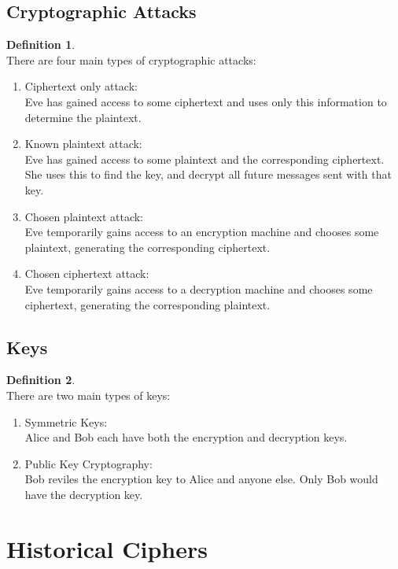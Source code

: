 \documentclass[letterpaper,10pt,twoside]{report}
\theoremstyle{plain}
\theoremstyle{definition}
\newtheorem{definition}{Definition}[section]
\theoremstyle{remark}
\begin{document}
\subsection{Cryptographic Attacks}
\begin{definition}{\ } \\
   There are four main types of cryptographic attacks:
\begin{enumerate}
   \item{Ciphertext only attack: \\ Eve has gained access to some ciphertext and uses only this information to determine the plaintext.}
   \item{Known plaintext attack: \\ Eve has gained access to some plaintext and the corresponding ciphertext. She uses this to find the key, and decrypt all future messages sent with that key.}
   \item{Chosen plaintext attack: \\ Eve temporarily gains access to an encryption machine and chooses some plaintext, generating the corresponding ciphertext.}
   \item{Chosen ciphertext attack: \\ Eve temporarily gains access to a decryption machine and chooses some ciphertext, generating the corresponding plaintext.}
\end{enumerate}
\end{definition}

\subsection{Keys}
\begin{definition}{\ } \\
   There are two main types of keys:
\begin{enumerate}
   \item{Symmetric Keys: \\ Alice and Bob each have both the encryption and decryption keys.}
   \item{Public Key Cryptography: \\ Bob reviles the encryption key to Alice and anyone else. Only Bob would have the decryption key.}
\end{enumerate}
\end{definition}

\section{Historical Ciphers}
\end{document}
